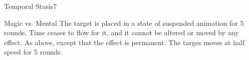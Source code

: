 \begin{spellsection}{Temporal Stasis}{7}
    \begin{spellheader}
    \end{spellheader}
    \begin{spellcontent}
        \begin{spelltargetinginfo}
        \end{spelltargetinginfo}
        \begin{spelleffects}
            \begin{spellattack}{Magic vs. Mental}
                \spellsuccess The target is placed in a state of suspended animation for 5 rounds. Time ceases to flow for it, and it cannot be altered or moved by any effect.
                \spellcritical As above, except that the effect is permanent.
                \spellfailure The targes moves at half speed for 5 rounds.
            \end{spellattack}
        \end{spelleffects}
    \end{spellcontent}
    \begin{spellfooter}
        \miscastrandom
    \end{spellfooter}
\end{spellsection}

